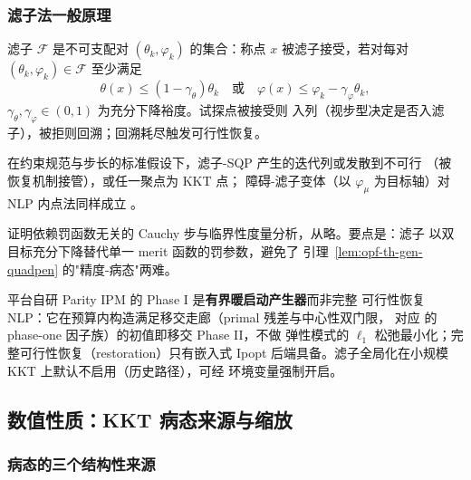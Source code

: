 \subsubsection{滤子法一般原理}

\begin{definition}[滤子与支配]\label{def:opf-th-gen-filter}
滤子 $\mathcal F$ 是不可支配对 $(\theta_k,\varphi_k)$ 的集合：称点 $x$
被滤子接受，若对每对 $(\theta_k,\varphi_k)\in\mathcal F$ 至少满足
\begin{equation}
\theta(x)\le(1-\gamma_\theta)\theta_k
\quad\text{或}\quad
\varphi(x)\le\varphi_k-\gamma_\varphi\theta_k,
\end{equation}
$\gamma_\theta,\gamma_\varphi\in(0,1)$ 为充分下降裕度。试探点被接受则
入列（视步型决定是否入滤子），被拒则回溯；回溯耗尽触发可行性恢复。
\end{definition}

\begin{theorem}[滤子方法全局收敛（陈述）]\label{thm:opf-th-gen-filter-global}
在约束规范与步长的标准假设下，滤子-SQP 产生的迭代列或发散到不可行
（被恢复机制接管），或任一聚点为 KKT 点\cite{opft:fletcher-leyffer}；
障碍-滤子变体（以 $\varphi_\mu$ 为目标轴）对 NLP 内点法同样成立
\cite{opft:waechter-biegler}。
\end{theorem}

证明依赖罚函数无关的 Cauchy 步与临界性度量分析，从略。要点是：滤子
以双目标充分下降替代单一 merit 函数的罚参数，避免了
引理~\ref{lem:opf-th-gen-quadpen} 的"精度-病态"两难。

\begin{gapnote}
平台自研 Parity IPM 的 Phase I 是\textbf{有界暖启动产生器}而非完整
可行性恢复 NLP：它在预算内构造满足移交走廊（primal 残差与中心性双门限，
对应  的 phase-one 因子族）的初值即移交 Phase II，不做
弹性模式的 $\ell_1$ 松弛最小化；完整可行性恢复（restoration）只有嵌入式
Ipopt 后端具备。滤子全局化在小规模 KKT 上默认不启用（历史路径），可经
环境变量强制开启。
\end{gapnote}

\subsection{数值性质：KKT 病态来源与缩放}\label{sec:opf-th-gen-conditioning}

\subsubsection{病态的三个结构性来源}

